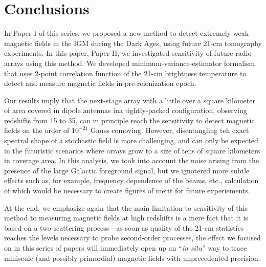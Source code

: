 \section{Conclusions}
\label{sec:conclusions}

In Paper I of this series, we proposed a new method to detect extremely weak magnetic fields in the IGM during the Dark Ages, using future 21-cm tomography experiments. In this paper, Paper II, we investigated sensitivity of future radio arrays using this method. We developed minimum-variance-estimator formalism that uses 2-point correlation function of the 21-cm brightness temperature to detect and measure magnetic fields in pre-reionization epoch. 

Our results imply that the next-stage array with a little over a square kilometer of area covered in dipole antennas ina  tightly-packed configuration, observing redshifts from 15 to 35, can in principle reach the sensitivity to detect magnetic fields on the order of $10^{-21}$ Gauss comoving. However, disentangling teh exact spectral shape of a stochastic field is more challenging, and can only be expected in the futuristic scenarios where arrays grow to a size of tens of square kilometers in coverage area. In this analysis, we took into account the noise arising from the presence of the large Galactic foreground signal, but we ignotered more subtle effects such as, for example, frequency dependence of the beams, etc., calculation of which would be necessary to create figures of merit for future experiements. 

At the end, we emphasize again that the main limitation to sensitivity of this method to measuring magnetic fields at high redshifts is a mere fact that it is based on a two-scattering process---as soon as quality of the 21-cm statistics reaches the levels necessary to probe second-order processes, the effect we focused on in this series of papers will immediately open up an ``\textit{in situ}'' way to trace miniscule (and possibly primordial) magnetic fields with unprecedented precision. 

  
